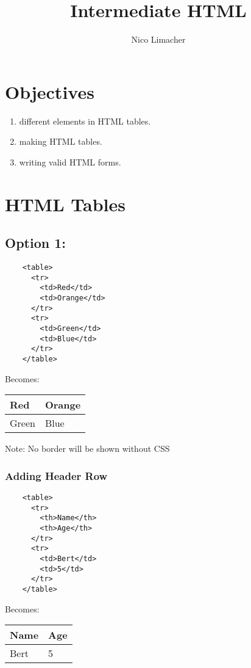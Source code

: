 \documentclass{article}
\begin{document}
	
	\title{Intermediate HTML}
	\author{Nico Limacher}
	
\maketitle
\section{Objectives}

\begin{enumerate}
	\itemsep0em
	\item different elements in HTML tables.
	\item making HTML tables.
	\item writing valid HTML forms.
\end{enumerate}

\section{HTML Tables}
	\subsection{Option 1:}
	\begin{verbatim}
	<table>
	  <tr>
	    <td>Red</td>
	    <td>Orange</td>
	  </tr>
	  <tr>
	    <td>Green</td>
	    <td>Blue</td>
	  </tr>
	</table>
	\end{verbatim}
	Becomes:
	
	\medskip
	\begin{tabular}{| l | l |}
		\hline
		Red & Orange \\ \hline
		Green & Blue\\ \hline
	\end{tabular}
	\medskip
	
	Note: No border will be shown without CSS
	
	\subsubsection{Adding Header Row}
	\begin{verbatim}
	<table>
	  <tr>
	    <th>Name</th>
	    <th>Age</th>
	  </tr>
	  <tr>
	    <td>Bert</td>
	    <td>5</td>
	  </tr>
	</table>
	\end{verbatim}
	Becomes:
	
	\medskip
	\begin{tabular}{| l | l |}
		\hline
		\textbf{Name} & \textbf{Age} \\ \hline
		Bert & 5 \\ \hline
	\end{tabular}
	\medskip
	
\end{document}
